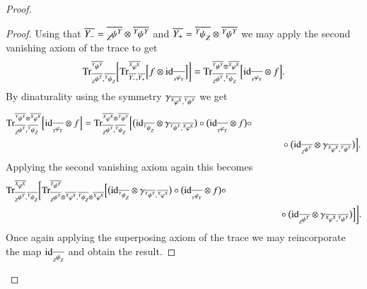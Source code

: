 \documentclass{amsart}
\def\tn{\textnormal}
\def\Trace{\tn{Tr}}
\def\ol{\overline}
\def\id{\tn{id}}
\newcommand{\inp}[1]{{#1_-}}
\newcommand{\outp}[1]{{#1_+}}
\newcommand{\feeddd}[3]{{\tensor*[^{#2}_{\color{white}{!}}]{{#1}}{^{#3}}}}%
\newcommand{\feeddc}[3]{{\tensor*[^{#2}]{{#1}}{_{#3}}}}
\newcommand{\feedcd}[3]{{\tensor*[_{#2}]{{#1}}{^{#3}}}}
\newcommand{\feedcc}[3]{{\tensor*[^{\color{white}{!}}_{#2}]{{#1}}{_{#3}}}}
\theoremstyle{remark}
\theoremstyle{definition}
\begin{document}
\begin{proof}
\begin{proof}
Using that $\ol{Y_-}=\ol{\feedcd{\psi}{Z}{Y}}\otimes\ol{\feeddd{\psi}{Y}{Y}}$ and $\ol{Y_+}=\ol{\feeddc{\psi}{Y}{Z}}\otimes\ol{\feeddd{\psi}{Y}{Y}}$ we may apply the second vanishing axiom of the trace to get
\[\Trace^{\ol{\feeddd{\psi}{Y}{Y}}}_{\ol{\feedcd{\psi}{Z}{Y}},\ol{\feeddc{\psi}{Y}{Z}}}
\bigg[\Trace^{\ol{\feeddd{\varphi}{X}{X}}}_{\ol{\inp{Y}},\ol{\outp{Y}}}\Big[f\otimes\id_{\ol{\feedcc{\varphi}{Y}{Y}}}\Big]\bigg]=\Trace^{\ol{\feeddd{\psi}{Y}{Y}}\otimes\ol{\feeddd{\varphi}{X}{X}}}_{\ol{\feedcd{\psi}{Z}{Y}},\ol{\feeddc{\psi}{Y}{Z}}}
\Big[\id_{\ol{\feedcc{\varphi}{Y}{Y}}}\otimes f\Big].\]
By dinaturality using the symmetry $\gamma_{\ol{\feeddd{\varphi}{X}{X}},\ol{\feeddd{\psi}{Y}{Y}}}$ we get
\begin{align*}
&\Trace^{\ol{\feeddd{\psi}{Y}{Y}}\otimes\ol{\feeddd{\varphi}{X}{X}}}_{\ol{\feedcd{\psi}{Z}{Y}},\ol{\feeddc{\psi}{Y}{Z}}}
\Big[\id_{\ol{\feedcc{\varphi}{Y}{Y}}}\otimes f\Big]
=\Trace^{\ol{\feeddd{\varphi}{X}{X}}\otimes\ol{\feeddd{\psi}{Y}{Y}}}_{\ol{\feedcd{\psi}{Z}{Y}},\ol{\feeddc{\psi}{Y}{Z}}}
\Big[
\big(\id_{\ol{\feeddc{\psi}{Y}{Z}}}\otimes\gamma_{\ol{\feeddd{\psi}{Y}{Y}},\ol{\feeddd{\varphi}{X}{X}}}\big)\circ\big(\id_{\ol{\feedcc{\varphi}{Y}{Y}}}\otimes f\big)\circ\\
&\hspace{4in}\circ\big(\id_{\ol{\feedcd{\psi}{Z}{Y}}}\otimes\gamma_{\ol{\feeddd{\varphi}{X}{X}},\ol{\feeddd{\psi}{Y}{Y}}}\big)
\Big].
\end{align*}
Applying the second vanishing axiom again this becomes
\begin{align*}
&\Trace^{\ol{\feeddd{\varphi}{X}{X}}}_{\ol{\feedcd{\psi}{Z}{Y}},\ol{\feeddc{\psi}{Y}{Z}}}
\bigg[
\Trace^{\ol{\feeddd{\psi}{Y}{Y}}}_{\ol{\feedcd{\psi}{Z}{Y}}\otimes\ol{\feeddd{\varphi}{X}{X}},\ol{\feeddc{\psi}{Y}{Z}}\otimes\ol{\feeddd{\varphi}{X}{X}}}
\Big[
\big(\id_{\ol{\feeddc{\psi}{Y}{Z}}}\otimes\gamma_{\ol{\feeddd{\psi}{Y}{Y}},\ol{\feeddd{\varphi}{X}{X}}}\big)\circ\big(\id_{\ol{\feedcc{\varphi}{Y}{Y}}}\otimes f\big)\circ\\
&\hspace{4in}\circ\big(\id_{\ol{\feedcd{\psi}{Z}{Y}}}\otimes\gamma_{\ol{\feeddd{\varphi}{X}{X}},\ol{\feeddd{\psi}{Y}{Y}}}\big)
\Big]
\bigg].
\end{align*}
Once again applying the superposing axiom of the trace we may reincorporate the map $\id_{\ol{\feedcc{\psi}{Z}{Z}}}$ and obtain the result.
\end{proof}


\end{proof}
\end{document}
